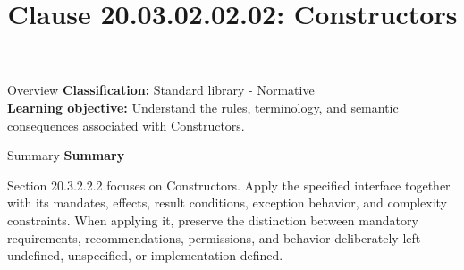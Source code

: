 \documentclass[10pt,letterpaper]{article}
\title{Clause 20.03.02.02.02: Constructors}
\author{}
\date{}
\begin{document}
\maketitle
\begin{CornellOverviewBox}{Overview}
\textbf{Classification:} Standard library - Normative\\[2pt]
\textbf{Learning objective:} Understand the rules, terminology, and semantic consequences associated with Constructors.
\end{CornellOverviewBox}\begin{CornellSummaryBox}{Summary}
{\sffamily\bfseries\color{Accent} Summary}\par\vspace{3pt}Section 20.3.2.2.2 focuses on Constructors. Apply the specified interface together with its mandates, effects, result conditions, exception behavior, and complexity constraints. When applying it, preserve the distinction between mandatory requirements, recommendations, permissions, and behavior deliberately left undefined, unspecified, or implementation-defined.
\end{CornellSummaryBox}
\end{document}
